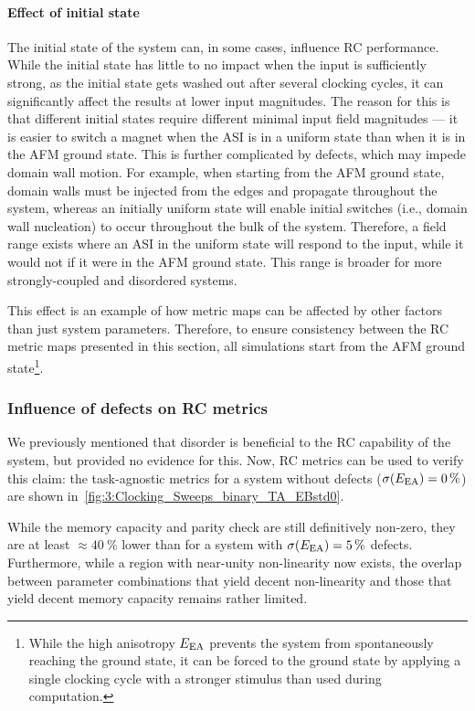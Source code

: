 \paragraph{Effect of initial state}
The initial state of the system can, in some cases, influence RC performance.
While the initial state has little to no impact when the input is sufficiently strong, as the initial state gets washed out after several clocking cycles, it can significantly affect the results at lower input magnitudes.
The reason for this is that different initial states require different minimal input field magnitudes --- it is easier to switch a magnet when the ASI is in a uniform state than when it is in the AFM ground state. %
This is further complicated by defects, which may impede domain wall motion.
For example, when starting from the AFM ground state, domain walls must be injected from the edges and propagate throughout the system, whereas an initially uniform state will enable initial switches (i.e., domain wall nucleation) to occur throughout the bulk of the system.
Therefore, a field range exists where an ASI in the uniform state will respond to the input, while it would not if it were in the AFM ground state.
This range is broader for more strongly-coupled and disordered systems. \par
This effect is an example of how metric maps can be affected by other factors than just system parameters.
Therefore, to ensure consistency between the RC metric maps presented in this section, all simulations start from the AFM ground state\footnote{
	While the high anisotropy $E_\mathrm{EA}$ prevents the system from spontaneously reaching the ground state, it can be forced to the ground state by applying a single clocking cycle with a stronger stimulus than used during computation.
}.

\subsubsection{Influence of defects on RC metrics}
We previously mentioned that disorder is beneficial to the RC capability of the system, but provided no evidence for this.
Now, RC metrics can be used to verify this claim: the task-agnostic metrics for a system without defects ($\sigma(E_\mathrm{EA}) = \SI{0}{\percent}$) are shown in~\cref{fig:3:Clocking_Sweeps_binary_TA_EBstd0}. \par
While the memory capacity and parity check are still definitively non-zero, they are at least $\approx \SI{40}{\percent}$ lower than for a system with $\sigma(E_\mathrm{EA}) = \SI{5}{\percent}$ defects.
Furthermore, while a region with near-unity non-linearity now exists, the overlap between parameter combinations that yield decent non-linearity and those that yield decent memory capacity remains rather limited. \\\par

